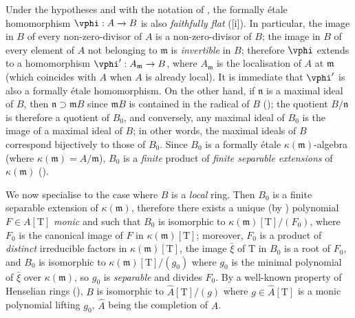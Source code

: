 \begin{env}[18.1.2]
\label{IV.18.1.2}
Under the hypotheses and with the notation of , the formally \'etale homomorphism $\vphi:A\to B$ is also \emph{faithfully flat} ([i]).
In particular, the image in $B$ of every non-zero-divisor of $A$ is a non-zero-divisor of $B$;
the image in $B$ of every element of $A$ not belonging to $\mathfrak{m}$ is \emph{invertible} in $B$;
therefore $\vphi$ extends to a homomorphism $\vphi':A_\mathfrak{m}\to B$, where $A_\mathfrak{m}$ is the localisation of $A$ at $\mathfrak{m}$ (which coincides with $A$ when $A$ is already local).
It is immediate that $\vphi'$ is also a formally \'etale homomorphism.
On the other hand, if $\mathfrak{n}$ is a maximal ideal of $B$, then $\mathfrak{n}\supset\mathfrak{m}B$ since $\mathfrak{m}B$ is contained in the radical of $B$ ();
the quotient $B/\mathfrak{n}$ is therefore a quotient of $B_0$, and conversely, any maximal ideal of $B_0$ is the image of a maximal ideal of $B$;
in other words, the maximal ideals of $B$ correspond bijectively to those of $B_0$.
Since $B_0$ is a formally \'etale $\kappa(\mathfrak{m})$-algebra (where $\kappa(\mathfrak{m})=A/\mathfrak{m}$), $B_0$ is a \emph{finite} product of \emph{finite separable extensions} of $\kappa(\mathfrak{m})$ ().
\end{env}

\begin{env}[18.1.3]
\label{IV.18.1.3}
We now specialise to the case where $B$ is a \emph{local} ring.
Then $B_0$ is a finite separable extension of $\kappa(\mathfrak{m})$, therefore there exists a unique (by ) polynomial $F\in A[\mathrm{T}]$ \emph{monic} and such that $B_0$ is isomorphic to $\kappa(\mathfrak{m})[\mathrm{T}]/(F_0)$, where $F_0$ is the canonical image of $F$ in $\kappa(\mathfrak{m})[\mathrm{T}]$;
moreover, $F_0$ is a product of \emph{distinct} irreducible factors in $\kappa(\mathfrak{m})[\mathrm{T}]$, the image $\bar{\xi}$ of $\mathrm{T}$ in $B_0$ is a root of $F_0$, and $B_0$ is isomorphic to $\kappa(\mathfrak{m})[\mathrm{T}]/(g_0)$ where $g_0$ is the minimal polynomial of $\bar{\xi}$ over $\kappa(\mathfrak{m})$, so $g_0$ is \emph{separable} and divides $F_0$.
By a well-known property of Henselian rings (), $B$ is isomorphic to $\hat{A}[\mathrm{T}]/(g)$ where $g\in\hat{A}[\mathrm{T}]$ is a monic polynomial lifting $g_0$, $\hat{A}$ being the completion of $A$.
\end{env}

